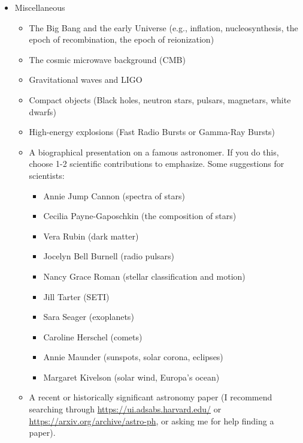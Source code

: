 \documentclass[11pt]{article}
\begin{document}
\begin{itemize}[noitemsep]
    \item Miscellaneous
        \begin{itemize}[noitemsep]
            \item The Big Bang and the early Universe (e.g., inflation, nucleosynthesis, the epoch of recombination, the epoch of reionization)
            \item The cosmic microwave background (CMB)
            \item Gravitational waves and LIGO
            \item Compact objects (Black holes, neutron stars, pulsars, magnetars, white dwarfs)
            \item High-energy explosions (Fast Radio Bursts or Gamma-Ray Bursts)
            \item A biographical presentation on a famous astronomer. If you do this, choose 1-2 scientific contributions to emphasize. Some suggestions for scientists:
            \begin{itemize}[noitemsep]
                \item Annie Jump Cannon (spectra of stars)
                \item Cecilia Payne-Gaposchkin (the composition of stars)
                \item Vera Rubin (dark matter)
                \item Jocelyn Bell Burnell (radio pulsars)
                \item Nancy Grace Roman (stellar classification and motion)
                \item Jill Tarter (SETI)
                \item Sara Seager (exoplanets)
                \item Caroline Herschel (comets)
                \item Annie Maunder (sunspots, solar corona, eclipses)
                \item Margaret Kivelson (solar wind, Europa’s ocean)
                
            \end{itemize}
            
            \item A recent or historically significant astronomy paper (I recommend searching through \url{https://ui.adsabs.harvard.edu/} or \url{https://arxiv.org/archive/astro-ph}, or asking me for help finding a paper).
        \end{itemize}
        
\end{itemize}
\end{document}
